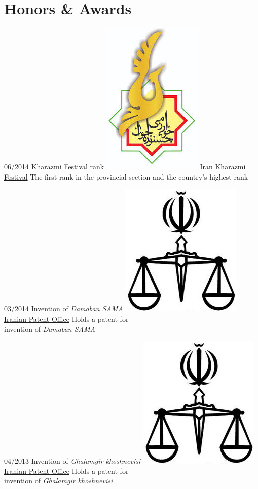 \documentclass[a4paper]{friggeri-cv}
\begin{document}

\section{Honors \& Awards}
\begin{entrylist}

              \entry
    {06/2014}
    {   Kharazmi Festival rank}
    {\href{http://kharazmi.medu.ir/fa/}{\includegraphics[scale=0.06]{img/YKharazmi_logo.jpg} Iran Kharazmi Festival}}
    {The first rank in the provincial section and the country's highest rank}
    
          \entry
    {03/2014}
    {   Invention of \emph{Damaban SAMA}}
    {\href{http://iripo.ssaa.ir/}{\includegraphics[scale=0.06]{img/Ghovveh_logo.jpg} Iranian Patent Office}}
    {Holds a patent for \\
    invention of \emph{Damaban SAMA}}

 \entry
    {04/2013}
    {   Invention of \emph{Ghalamgir khoshnevisi}}
    {\href{http://iripo.ssaa.ir/}{\includegraphics[scale=0.06]{img/Ghovveh_logo.jpg} Iranian Patent Office}}
    {Holds a patent for\\
    invention of \emph{Ghalamgir khoshnevisi}}

\end{entrylist}
\end{document}

